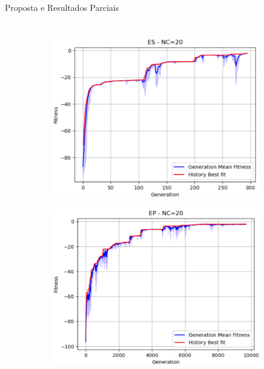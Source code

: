 \documentclass[pdf]{beamer}
\begin{document}
\begin{frame}{Proposta e Resultados Parciais}
\begin{columns}
			\begin{figure}
				\begin{subfigure}[t]{0.55\textwidth}
					\includegraphics[width=\linewidth]{img/ES_NC20_exemplo.png}
				\end{subfigure}
				\begin{subfigure}[t]{0.55\textwidth}
					\includegraphics[width=\linewidth]{img/EP_NC20_exemplo.png}
				\end{subfigure}
				\begin{subfigure}[t]{0.55\textwidth}

\end{subfigure}
\end{figure}
\end{columns}
\end{frame}
\end{document}
